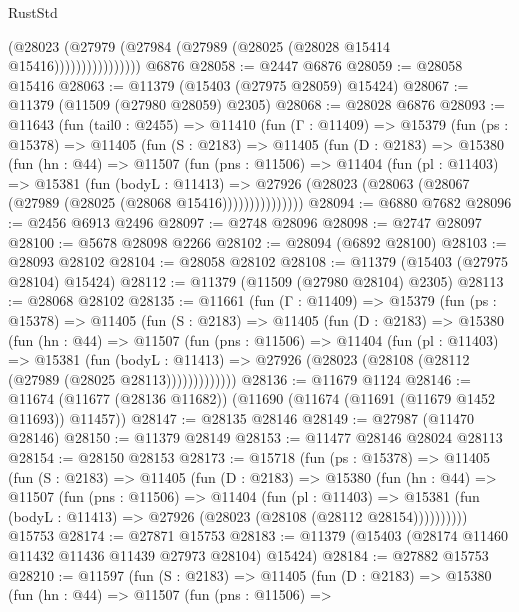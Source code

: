 \begin{lexlean}{RustStd}
\begin{coremodule}
                        (@28023
                          (@27979 (@27984 (@27989 (@28025 (@28028 @15414 @15416))))))))))))))))
    @6876
@28058 := @2447 @6876
@28059 := @28058 @15416
@28063 := @11379 (@15403 (@27975 @28059) @15424)
@28067 := @11379 (@11509 (@27980 @28059) @2305)
@28068 := @28028 @6876
@28093 := @11643
    (fun (tail0 : @2455) =>
    @11410
      (fun (Γ : @11409) =>
      @15379
        (fun (ps : @15378) =>
        @11405
          (fun (S : @2183) =>
          @11405
            (fun (D : @2183) =>
            @15380
              (fun (hn : @44) =>
              @11507
                (fun (pns : @11506) =>
                @11404
                  (fun (pl : @11403) =>
                  @15381
                    (fun (bodyL : @11413) =>
                    @27926 (@28023 (@28063 (@28067 (@27989 (@28025 (@28068 @15416)))))))))))))))
@28094 := @6880 @7682
@28096 := @2456 @6913 @2496
@28097 := @2748 @28096
@28098 := @2747 @28097
@28100 := @5678 @28098 @2266
@28102 := @28094 (@6892 @28100)
@28103 := @28093 @28102
@28104 := @28058 @28102
@28108 := @11379 (@15403 (@27975 @28104) @15424)
@28112 := @11379 (@11509 (@27980 @28104) @2305)
@28113 := @28068 @28102
@28135 := @11661
    (fun (Γ : @11409) =>
    @15379
      (fun (ps : @15378) =>
      @11405
        (fun (S : @2183) =>
        @11405
          (fun (D : @2183) =>
          @15380
            (fun (hn : @44) =>
            @11507
              (fun (pns : @11506) =>
              @11404
                (fun (pl : @11403) =>
                @15381
                  (fun (bodyL : @11413) =>
                  @27926 (@28023 (@28108 (@28112 (@27989 (@28025 @28113)))))))))))))
@28136 := @11679 @1124
@28146 := @11674 (@11677 (@28136 @11682)) (@11690 (@11674 (@11691 (@11679 @1452 @11693)) @11457))
@28147 := @28135 @28146
@28149 := @27987 (@11470 @28146)
@28150 := @11379 @28149
@28153 := @11477 @28146 @28024 @28113
@28154 := @28150 @28153
@28173 := @15718
    (fun (ps : @15378) =>
    @11405
      (fun (S : @2183) =>
      @11405
        (fun (D : @2183) =>
        @15380
          (fun (hn : @44) =>
          @11507
            (fun (pns : @11506) =>
            @11404
              (fun (pl : @11403) =>
              @15381 (fun (bodyL : @11413) => @27926 (@28023 (@28108 (@28112 @28154))))))))))
    @15753
@28174 := @27871 @15753
@28183 := @11379 (@15403 (@28174 @11460 @11432 @11436 @11439 @27973 @28104) @15424)
@28184 := @27882 @15753
@28210 := @11597
    (fun (S : @2183) =>
    @11405
      (fun (D : @2183) =>
      @15380
        (fun (hn : @44) =>
        @11507
          (fun (pns : @11506) =>

\end{coremodule}
\end{lexlean}

